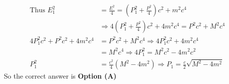 \begin{enumerate}
\begin{answer}
\begin{align*}
\text{Thus }E_{1}^{2}&=\frac{E^{2}}{4}=\left(P_{1}^{2}+\frac{P^{2}}{4}\right) c^{2}+m^{2} c^{4} \\&\Rightarrow 4\left(P_{1}^{2}+\frac{P^{2}}{4}\right) c^{2}+4 m^{2} c^{4}=P^{2} c^{2}+M^{2} c^{4}\\
4 P_{1}^{2} c^{2}+P^{2} c^{2}+4 m^{2} c^{4}&=P^{2} c^{2}+M^{2} c^{4} \Rightarrow 4 P_{1}^{2} c^{2}+4 m^{2} c^{4}\\&=M^{2} c^{4} \Rightarrow 4 P_{1}^{2}=M^{2} c^{2}-4 m^{2} c^{2}\\
P_{1}^{2}&=\frac{c^{2}}{4}\left(M^{2}-4 m^{2}\right) \Rightarrow P_{1}=\frac{c}{2} \sqrt{M^{2}-4 m^{2}}
\end{align*}
So the correct answer is \textbf{Option (A)}
\end{answer}
\end{enumerate}